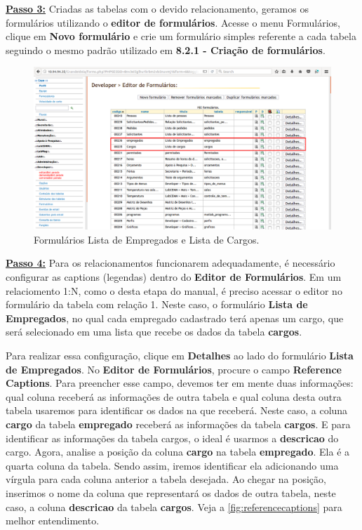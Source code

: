 \documentclass[9pt]{report}
\begin{document}
{      \underline{\textbf{Passo 3:}} Criadas as tabelas com o devido
      relacionamento, geramos os formulários utilizando o
      \textbf{editor de formulários}. Acesse o menu Formulários,
      clique em \textbf{Novo formulário} e crie um formulário simples
      referente a cada tabela seguindo o mesmo padrão utilizado em
      \textbf{8.2.1 - Criação de formulários}.
      
      \begin{figure}[H]
        \includegraphics[width=\textwidth]{2_Formularios/3_Relacionamento_1_N/28.png}
        \caption{Formulários Lista de Empregados e Lista de Cargos.}
        \label{fig:listaempregadoscargos}
      \end{figure}

      \underline{\textbf{Passo 4:}} Para os relacionamentos
      funcionarem adequadamente, é necessário configurar as captions
      (legendas) dentro do \textbf{Editor de Formulários}. Em um
      relaciomento 1:N, como o desta etapa do manual, é preciso
      acessar o editor no formulário da tabela com relação 1. Neste
      caso, o formulário \textbf{Lista de Empregados}, no qual cada
      empregado cadastrado terá apenas um cargo, que será selecionado
      em uma lista que recebe os dados da tabela \textbf{cargos}.

      Para realizar essa configuração, clique em \textbf{Detalhes} ao
      lado do formulário \textbf{Lista de Empregados}. No
      \textbf{Editor de Formulários}, procure o campo
      \textbf{Reference Captions}. Para preencher esse campo, devemos
      ter em mente duas informações: qual coluna receberá as
      informações de outra tabela e qual coluna desta outra tabela
      usaremos para identificar os dados na que receberá. Neste caso,
      a coluna \textbf{cargo} da tabela \textbf{empregado} receberá
      as informações da tabela \textbf{cargos}. E para identificar as
      informações da tabela cargos, o ideal é usarmos a
      \textbf{descricao} do cargo. Agora, analise a posição da coluna
      \textbf{cargo} na tabela \textbf{empregado}. Ela é a quarta
      coluna da tabela. Sendo assim, iremos identificar ela
      adicionando uma vírgula para cada coluna anterior a tabela
      desejada. Ao chegar na posição, inserimos o nome da coluna que
      representará os dados de outra tabela, neste caso, a coluna
      \textbf{descricao} da tabela \textbf{cargos}. Veja a
      \figurename{ \ref{fig:referencecaptions}} para melhor
      entendimento.

}
\end{document}
